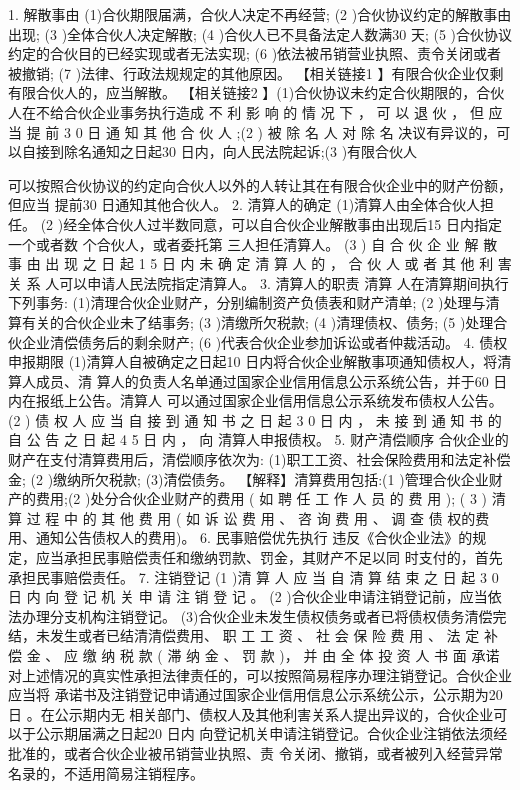 \documentclass[UTF8,12pt]{ctexart}
\numberwithin{equation}{section} %
\numberwithin{figure}{section}
\numberwithin{table}{section}
\begin{document}
	 1. 解散事由 (1)合伙期限届满，合伙人决定不再经营;
	 (2 )合伙协议约定的解散事由出现;
	 (3 )全体合伙人决定解散;
	 (4 )合伙人已不具备法定人数满30 天;
	 (5 )合伙协议约定的合伙目的已经实现或者无法实现; (6 )依法被吊销营业执照、责令关闭或者被撤销;
	 (7 )法律、行政法规规定的其他原因。
	 【相关链接1 】有限合伙企业仅剩有限合伙人的，应当解散。
	 【相关链接2 】(1)合伙协议未约定合伙期限的，合伙人在不给合伙企业事务执行造成 不 利 影 响 的 情 况 下 ， 可 以 退 伙 ， 但 应 当 提 前 3 0 日 通 知 其 他 合 伙 人 ;(2 ) 被 除 名 人 对 除 名 决议有异议的，可以自接到除名通知之日起30 日内，向人民法院起诉;(3 )有限合伙人
	 
	 可以按照合伙协议的约定向合伙人以外的人转让其在有限合伙企业中的财产份额，但应当 提前30 日通知其他合伙人。
	 2. 清算人的确定
	 (1)清算人由全体合伙人担任。
	 (2 )经全体合伙人过半数同意，可以自合伙企业解散事由出现后15 日内指定 一个或者数 个合伙人，或者委托第 三人担任清算人。
	 (3 ) 自 合 伙 企 业 解 散 事 由 出 现 之 日 起 1 5 日 内 未 确 定 清 算 人 的 ， 合 伙 人 或 者 其 他 利 害 关 系 人可以申请人民法院指定清算人。
	 3. 清算人的职责
	 清算 人在清算期间执行 下列事务: (1)清理合伙企业财产，分别编制资产负债表和财产清单;
	 (2 )处理与清算有关的合伙企业未了结事务;
	 (3 )清缴所欠税款;
	 (4 )清理债权、债务;
	 (5 )处理合伙企业清偿债务后的剩余财产;
	 (6 )代表合伙企业参加诉讼或者仲裁活动。
	 4. 债权申报期限
	 (1)清算人自被确定之日起10 日内将合伙企业解散事项通知债权人，将清算人成员、清 算人的负责人名单通过国家企业信用信息公示系统公告，并于60 日内在报纸上公告。清算人 可以通过国家企业信用信息公示系统发布债权人公告。
	 (2 ) 债 权 人 应 当 自 接 到 通 知 书 之 日 起 3 0 日 内 ， 未 接 到 通 知 书 的 自 公 告 之 日 起 4 5 日 内 ， 向 清算人申报债权。
	 5. 财产清偿顺序
	 合伙企业的财产在支付清算费用后，清偿顺序依次为: (1)职工工资、社会保险费用和法定补偿金;
	 (2 )缴纳所欠税款;
	 (3)清偿债务。
	 【解释】清算费用包括:(1 )管理合伙企业财产的费用;(2 )处分合伙企业财产的费用 ( 如 聘 任 工 作 人 员 的 费 用 ); ( 3 ) 清 算 过 程 中 的 其 他 费 用 ( 如 诉 讼 费 用 、 咨 询 费 用 、 调 查 债 权的费用、通知公告债权人的费用)。
	 6. 民事赔偿优先执行 违反《合伙企业法》的规定，应当承担民事赔偿责任和缴纳罚款、罚金，其财产不足以同 时支付的，首先承担民事赔偿责任。
	 7. 注销登记
	 (1 )清 算 人 应 当 自 清 算 结 束 之 日 起 3 0 日 内 向 登 记 机 关 申 请 注 销 登 记 。
	 (2 )合伙企业申请注销登记前，应当依法办理分支机构注销登记。 (3)合伙企业未发生债权债务或者已将债权债务清偿完结，未发生或者已结清清偿费用、 职 工 工 资 、 社 会 保 险 费 用 、 法 定 补 偿 金 、 应 缴 纳 税 款 ( 滞 纳 金 、 罚 款 )， 并 由 全 体 投 资 人 书 面
	 承诺对上述情况的真实性承担法律责任的，可以按照简易程序办理注销登记。合伙企业应当将 承诺书及注销登记申请通过国家企业信用信息公示系统公示，公示期为20日 。在公示期内无 相关部门、债权人及其他利害关系人提出异议的，合伙企业可以于公示期届满之日起20 日内 向登记机关申请注销登记。合伙企业注销依法须经批准的，或者合伙企业被吊销营业执照、责 令关闭、撤销，或者被列入经营异常名录的，不适用简易注销程序。
\end{document}
